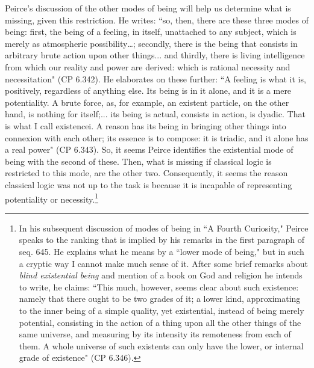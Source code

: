\documentclass[12pt]{article}
\begin{document}
Peirce's discussion of the other modes of being will help us determine what is missing, given this restriction. He writes: ``so, then, there are these three modes of being: first, the being of a feeling, in itself, unattached to any subject, which is merely as atmospheric possibility…; secondly, there is the being that consists in arbitrary brute action upon other things... and thirdly, there is living intelligence from which our reality and power are derived: which is rational necessity and necessitation" (CP 6.342). He elaborates on these further: ``A feeling is what it is, positively, regardless of anything else. Its being is in it alone, and it is a mere potentiality. A brute force, as, for example, an existent particle, on the other hand, is nothing for itself;... its being is actual, consists in action, is dyadic. That is what I call existencei. A reason has its being in bringing other things into connexion with each other; its essence is to compose: it is triadic, and it alone has a real power" (CP 6.343). So, it seems Peirce identifies the existential mode of being with the second of these. Then, what is missing if classical logic is restricted to this mode, are the other two. Consequently, it seems the reason classical logic was not up to the task is because it is incapable of representing potentiality or necessity.\footnote{In his subsequent discussion of modes of being in ``A Fourth Curiosity," Peirce speaks to the ranking that is implied by his remarks in the first paragraph of seq. 645. He explains what he means by a ``lower mode of being," but in such a cryptic way I cannot make much sense of it. After some brief remarks about \textit{blind existential being} and mention of a book on God and religion he intends to write, he claims: ``This much, however, seems clear about such existence: namely that there ought to be two grades of it; a lower kind, approximating to the inner being of a simple quality, yet existential, instead of being merely potential, consisting in the action of a thing upon all the other things of the same universe, and measuring by its intensity its remoteness from each of them. A whole universe of such existents can only have the lower, or internal grade of existence" (CP 6.346).} 
\end{document}
